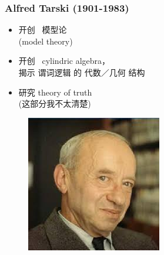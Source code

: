 \documentclass[17pt]{beamer}
\begin{document}
\begin{frame}
\frametitle{Alfred Tarski (1901-1983)}
\fontsize{16}{16}\selectfont
\begin{minipage}[t]{0.62\linewidth}
	\begin{itemize}
		\item 开创 {\color{red} \ 模型论} \\ (model theory)
		\item 开创 {\color{red} \ cylindric algebra}， \\
		揭示 谓词逻辑 的 代数／几何 结构
		\item 研究 theory of truth \\
		(这部分我不太清楚)
	\end{itemize}
\end{minipage}
\hfill
\begin{minipage}[t]{0.35\linewidth}
	\begin{figure}[H]
		\includegraphics[scale=0.5]{Tarski.jpg}
	\end{figure}
\end{minipage}
\end{frame}
\end{document}
